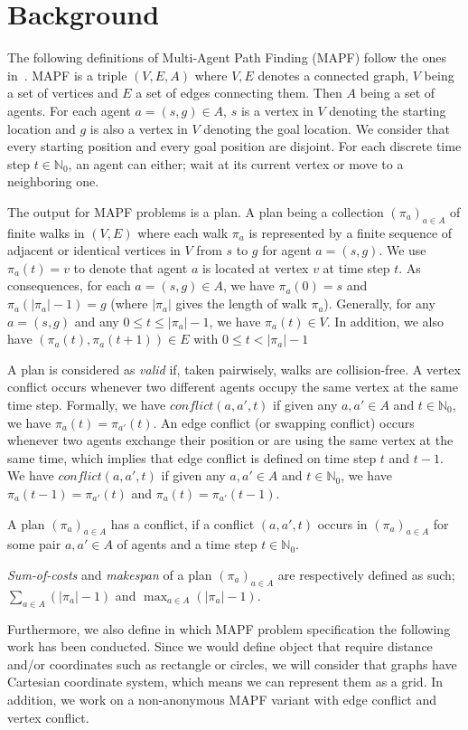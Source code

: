 \section{Background}\label{sec:background}

The following definitions of Multi-Agent Path Finding (MAPF) follow the ones in~\cite{husvobbass22a}. MAPF is a triple $(V,E,A)$ where \(V,E\) denotes a connected graph, \(V\) being a set of vertices and \(E\) a set of edges connecting them. Then \(A\) being a set of agents. For each agent \(a=(s,g) \in A\), \(s\) is a vertex in \(V\) denoting the starting location and \(g\) is also a vertex in \(V\) denoting the goal location. We consider that every starting position and every goal position are disjoint.
For each discrete time step \(t\in \mathbb{N}_0\), an agent can either; wait at its current vertex or move to a neighboring one.

The output for MAPF problems is a plan. A plan being a collection $(\pi_a)_{a\in A}$ of finite walks in $(V,E)$ where each walk $\pi_a$ is represented by a finite sequence of adjacent or identical vertices in $V$ from $s$ to $g$ for agent $a = (s,g)$. We use \(\pi_a (t) = v\) to denote that agent \(a\) is located at vertex \(v\) at time step \(t\). 
As consequences, for each \(a=(s,g) \in A\), we have $\pi_a(0) = s$ and  $\pi_a(|\pi_a|-1) = g$ (where $|\pi_a|$ gives the length of walk $\pi_a$). Generally, for any \(a=(s,g)\) and any $0 \leq t \leq |\pi_a|-1$, we have \(\pi_a(t) \in V\). In addition, we also have $(\pi_a(t),\pi_a(t+1))\in E$ with $0 \leq t < |\pi_a|-1$

A plan is considered as \textit{valid} if, taken pairwisely, walks are collision-free. A vertex conflict occurs whenever two different agents occupy the same vertex at the same time step. Formally, we have \(conflict(a,a',t)\) if given any $a,a'\in A$  and $t\in\mathbb{N}_0$, we have $\pi_a(t) = \pi_{a'}(t)$. An edge conflict (or swapping conflict) occurs whenever two agents exchange their position or are using the same vertex at the same time, which implies that edge conflict is defined on time step \(t\) and \(t-1\). We have \(conflict(a,a',t)\) if given any $a,a'\in A$  and $t\in\mathbb{N}_0$, we have $\pi_a(t-1) = \pi_{a'}(t)$ and $\pi_a(t) = \pi_{a'}(t-1)$.

A plan $(\pi_a)_{a\in A}$ has a conflict, if a conflict $(a, a',t)$ occurs in $(\pi_a)_{a\in A}$ for some pair $a,a'\in A$ of agents and a time step $t\in\mathbb{N}_0$.

\textit{Sum-of-costs} and \textit{makespan} of a plan $(\pi_a)_{a\in A}$ are respectively defined as such; $\sum_{a\in A} (|\pi_a| - 1)$ and $\max_{a\in A} (|\pi_a| - 1)$.


Furthermore, we also define in which MAPF problem specification the following work has been conducted. Since we would define object that require distance and/or coordinates such as rectangle or circles, we will consider that graphs have Cartesian coordinate system, which means we can represent them as a grid. In addition, we work on a non-anonymous MAPF variant with edge conflict and vertex conflict. 




